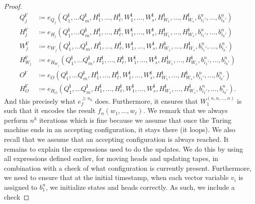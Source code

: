 \begin{proof}
	\begin{align*}
		Q_j^{\mathbf{i}'}&\coloneqq e_{Q_j}(Q_1^{\mathbf{i}},\ldots Q_m^{\mathbf{i}},H_1^{\mathbf{i}},\ldots,H_\ell^{\mathbf{i}},W_1^{\mathbf{i}},\ldots,W_s^{\mathbf{i}},H_{W_1}^{\mathbf{i}},\ldots,H_{W_s}^{\mathbf{i}},b_{i_1'}^n,\ldots,b_{i_k'}^n)\\
		H_j^{\mathbf{i}'}&\coloneqq e_{H_j}(Q_1^{\mathbf{i}},\ldots Q_m^{\mathbf{i}},H_1^{\mathbf{i}},\ldots,H_\ell^{\mathbf{i}},W_1^{\mathbf{i}},\ldots,W_s^{\mathbf{i}},H_{W_1}^{\mathbf{i}},\ldots,H_{W_s}^{\mathbf{i}},b_{i_1'}^n,\ldots,b_{i_k'}^n)\\
		W_j^{\mathbf{i}'}&\coloneqq e_{W_j}(Q_1^{\mathbf{i}},\ldots Q_m^{\mathbf{i}},H_1^{\mathbf{i}},\ldots,H_\ell^{\mathbf{i}},W_1^{\mathbf{i}},\ldots,W_s^{\mathbf{i}},H_{W_1}^{\mathbf{i}},\ldots,H_{W_s}^{\mathbf{i}},b_{i_1'}^n,\ldots,b_{i_k'}^n)\\
				H_{W_j}^{\mathbf{i}'}&\coloneqq e_{H_{W_j}}(Q_1^{\mathbf{i}},\ldots Q_m^{\mathbf{i}},H_1^{\mathbf{i}},\ldots,H_\ell^{\mathbf{i}},W_1^{\mathbf{i}},\ldots,W_s^{\mathbf{i}},H_{W_1}^{\mathbf{i}},\ldots,H_{W_s}^{\mathbf{i}},b_{i_1'}^n,\ldots,b_{i_k'}^n)\\
O^{\mathbf{i}'}&\coloneqq e_{O}(Q_1^{\mathbf{i}},\ldots Q_m^{\mathbf{i}},H_1^{\mathbf{i}},\ldots,H_\ell^{\mathbf{i}},W_1^{\mathbf{i}},\ldots,W_s^{\mathbf{i}},H_{W_1}^{\mathbf{i}},\ldots,H_{W_s}^{\mathbf{i}},b_{i_1'}^n,\ldots,b_{i_k'}^n)\\
H_{O}^{\mathbf{i}'}&\coloneqq e_{H_O}(Q_1^{\mathbf{i}},\ldots Q_m^{\mathbf{i}},H_1^{\mathbf{i}},\ldots,H_\ell^{\mathbf{i}},W_1^{\mathbf{i}},\ldots,W_s^{\mathbf{i}},H_{W_1}^{\mathbf{i}},\ldots,H_{W_s}^{\mathbf{i}},b_{i_1'}^n,\ldots,b_{i_k'}^n).
	\end{align*}
And this precisely what $e_f^{\geq n_0}$ does. Furthermore,	it ensures that  $W_1^{(n,n,\ldots,n)}$ is such that it encodes the result $f_n(w_1,\ldots,w_\ell)$. We remark that we
always perform $n^k$ iterations which is fine because we assume that once the Turing machine ends in an accepting configuration,
it stays there (it loops). We also recall that we assume that an accepting configuration is always reached. It remains to
explain the expressions used to do the updates. We do this by using all expressions defined earlier, for moving heads and updating
tapes, in combination with a check of what configuration is currently present. Furthermore, we need to ensure that at the initial timestamp,
when each vector variable $v_i$ is assigned to $b_1^n$, we initialize states and heads correctly. As such, we include a check

\end{proof}
